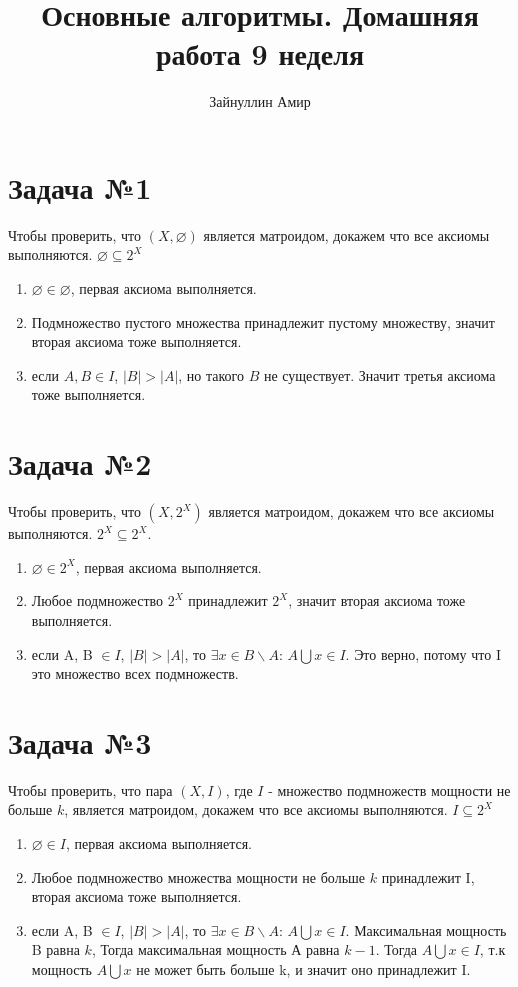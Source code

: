 \documentclass{article}
\begin{document}
\title{\textbf{Основные алгоритмы. Домашняя работа 9 неделя}}


\author{Зайнуллин Амир}
\maketitle


\section*{Задача №1}

Чтобы проверить, что $(X,{ \varnothing })$ является матроидом, докажем что все аксиомы выполняются. $\varnothing \subseteq 2^X$ 
\begin{enumerate}
    \item $\varnothing \in \varnothing$, первая аксиома выполняется.
    \item Подмножество пустого множества принадлежит пустому множеству, значит вторая аксиома тоже выполняется.
    \item если $A, B \in I$, $|B| > |A|$, но такого $B$ не существует. Значит третья аксиома тоже выполняется. 
\end{enumerate}

\section*{Задача №2}
Чтобы проверить, что $(X,{ 2^X })$ является матроидом, докажем что все аксиомы выполняются. $ 2^X \subseteq 2^X$. 
\begin{enumerate}
    \item $\varnothing \in 2^X$, первая аксиома выполняется.
    \item Любое подмножество $2^X$ принадлежит $2^X$, значит вторая аксиома тоже выполняется.
    \item если A, B $\in I$, $|B| > |A|$, то $\exists x \in B \backslash A$: $A \bigcup x \in I$. Это верно, потому что I это множество всех подмножеств. 
\end{enumerate}

\section*{Задача №3} 
Чтобы проверить, что пара $(X, I)$, где $I$ - множество подмножеств мощности не больше $k$, является матроидом, докажем что все аксиомы выполняются. $ I \subseteq 2^X$
\begin{enumerate}
    \item $\varnothing \in I$, первая аксиома выполняется.
    \item Любое подмножество множества мощности не больше $k$ принадлежит I, вторая аксиома тоже выполняется. 
    \item если A, B $\in I$, $|B| > |A|$, то $\exists x \in B \backslash A$: $A \bigcup x \in I$. Максимальная мощность B равна $k$, Тогда максимальная мощность А равна $k - 1$. Тогда $A \bigcup x \in I$, т.к мощность $A \bigcup x$ не может быть больше k, и значит оно принадлежит I.
\end{enumerate}
\end{document}
